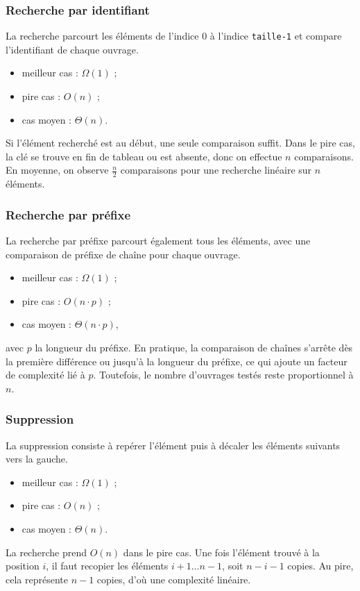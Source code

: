 \documentclass[12pt,a4paper]{article}
\begin{document}
\subsubsection{Recherche par identifiant}
La recherche parcourt les éléments de l’indice 0 à l’indice \texttt{taille-1} et compare l’identifiant de chaque ouvrage.
\begin{itemize}
  \item meilleur cas : $\Omega(1)$ ;
  \item pire cas : $O(n)$ ;
  \item cas moyen : $\Theta(n)$.
\end{itemize}
Si l’élément recherché est au début, une seule comparaison suffit. Dans le pire cas, la clé se trouve en fin de tableau ou est absente, donc on effectue $n$ comparaisons. En moyenne, on observe $\frac{n}{2}$ comparaisons pour une recherche linéaire sur $n$ éléments.

\subsubsection{Recherche par préfixe}
La recherche par préfixe parcourt également tous les éléments, avec une comparaison de préfixe de chaîne pour chaque ouvrage.
\begin{itemize}
  \item meilleur cas : $\Omega(1)$ ;
  \item pire cas : $O(n \cdot p)$ ;
  \item cas moyen : $\Theta(n \cdot p)$,
\end{itemize}
avec $p$ la longueur du préfixe. En pratique, la comparaison de chaînes s’arrête dès la première différence ou jusqu’à la longueur du préfixe, ce qui ajoute un facteur de complexité lié à $p$. Toutefois, le nombre d’ouvrages testés reste proportionnel à $n$.

\subsubsection{Suppression}
La suppression consiste à repérer l’élément puis à décaler les éléments suivants vers la gauche.
\begin{itemize}
  \item meilleur cas : $\Omega(1)$ ;
  \item pire cas : $O(n)$ ;
  \item cas moyen : $\Theta(n)$.
\end{itemize}
La recherche prend $O(n)$ dans le pire cas. Une fois l’élément trouvé à la position $i$, il faut recopier les éléments $i+1\ldots n-1$, soit $n-i-1$ copies. Au pire, cela représente $n-1$ copies, d’où une complexité linéaire.
\end{document}
